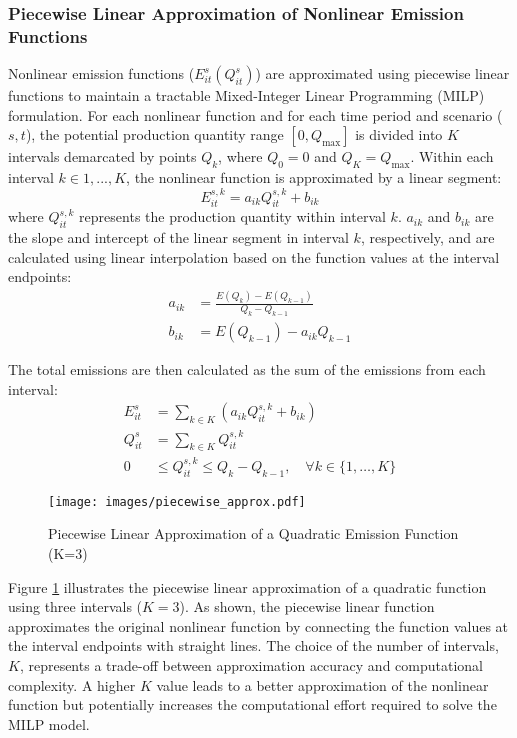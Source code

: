 \documentclass[final,3p,times,review,authoryear]{elsarticle}
\begin{document}
\subsubsection{Piecewise Linear Approximation of Nonlinear Emission Functions}
Nonlinear emission functions ($E_{it}^s(Q_{it}^s)$) are approximated using piecewise linear functions to maintain a tractable Mixed-Integer Linear Programming (MILP) formulation. For each nonlinear function and for each time period and scenario ($s, t$), the potential production quantity range $[0, Q_{\text{max}}]$ is divided into $K$ intervals demarcated by points $Q_k$, where $Q_0 = 0$ and $Q_K = Q_{\text{max}}$. Within each interval $k \in {1, ..., K}$, the nonlinear function is approximated by a linear segment:
\begin{equation}
E_{it}^{s,k} = a_{ik} Q_{it}^{s,k} + b_{ik}
\end{equation}
where $Q_{it}^{s,k}$ represents the production quantity within interval $k$. $a_{ik}$ and $b_{ik}$ are the slope and intercept of the linear segment in interval $k$, respectively, and are calculated using linear interpolation based on the function values at the interval endpoints:
\begin{align*}
a_{ik} &= \frac{E(Q_k) - E(Q_{k-1})}{Q_k - Q_{k-1}} \\
b_{ik} &= E(Q_{k-1}) - a_{ik} Q_{k-1}
\end{align*}


The total emissions are then calculated as the sum of the emissions from each interval:
\begin{align}
E_{it}^s &= \sum_{k \in K} \left( a_{ik} Q_{it}^{s,k} + b_{ik} \right) \\
Q_{it}^s &= \sum_{k \in K} Q_{it}^{s,k} \\
0 &\leq Q_{it}^{s,k} \leq Q_k - Q_{k-1}, \quad \forall k \in \{1, \dots, K\}
\end{align}

\begin{figure}[H]
\centering
\texttt{[image: images/piecewise\_approx.pdf]}
\caption{Piecewise Linear Approximation of a Quadratic Emission Function (K=3)}
\label{fig:piecewise_approx}
\end{figure}

Figure \ref{fig:piecewise_approx} illustrates the piecewise linear approximation of a quadratic function using three intervals ($K=3$). As shown, the piecewise linear function approximates the original nonlinear function by connecting the function values at the interval endpoints with straight lines.
The choice of the number of intervals, $K$, represents a trade-off between approximation accuracy and computational complexity. A higher $K$ value leads to a better approximation of the nonlinear function but potentially increases the computational effort required to solve the MILP model.
\end{document}
